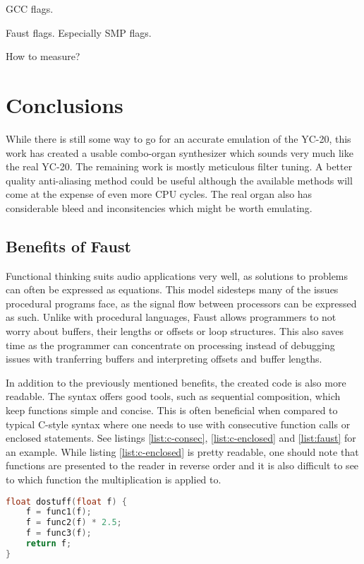 \documentclass[11pt,a4paper]{article}
\begin{document}
GCC flags.

Faust flags. Especially SMP flags.

How to measure?

\section{Conclusions}

While there is still some way to go for an accurate emulation of the YC-20, this work has created a usable combo-organ synthesizer which sounds very much like the real YC-20.  The remaining work is mostly meticulous filter tuning. A better quality anti-aliasing method could be useful although the available methods will come at the expense of even more CPU cycles. The real organ also has considerable bleed and inconsitencies which might be worth emulating.

\subsection{Benefits of Faust}

Functional thinking suits audio applications very well, as solutions to problems can often be expressed as equations. This model sidesteps many of the issues procedural programs face, as the signal flow between processors can be expressed as such. Unlike with procedural languages, Faust allows programmers to not worry about buffers, their lengths or offsets or loop structures. This also saves time as the programmer can concentrate on processing instead of debugging issues with tranferring buffers and interpreting offsets and buffer lengths.

In addition to the previously mentioned benefits, the created code is also more readable. The syntax offers good tools, such as sequential composition, which keep functions simple and concise. This is often beneficial when compared to typical C-style syntax where one needs to use with consecutive function calls or enclosed statements. See listings \ref{list:c-consec}, \ref{list:c-enclosed} and \ref{list:faust} for an example. While listing \ref{list:c-enclosed} is pretty readable, one should note that functions are presented to the reader in reverse order and it is also difficult to see to which function the multiplication is applied to.

\begin{lstlisting}[language=C,label=list:c-consec,caption=Consecutive calls]
float dostuff(float f) {
	f = func1(f);
	f = func2(f) * 2.5;
	f = func3(f);
	return f;
}
\end{lstlisting}
\end{document}
